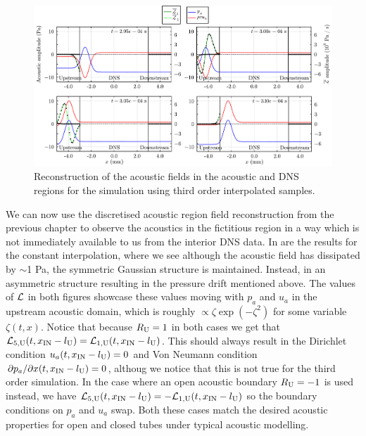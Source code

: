 \begin{figure}[t]
\centering
\includegraphics[scale=0.35]{assets/graphs/ac_frames.pdf}
\caption{Reconstruction of the acoustic fields in the acoustic and DNS regions for the simulation using third order interpolated samples.}
\label{fig:ac-reconstruct_order3}
\end{figure}

We can now use the discretised acoustic region field reconstruction from the previous chapter to observe the acoustics in the fictitious region in a way which is not immediately available to us from the interior DNS data. In  are the results for the constant interpolation, where we see although the acoustic field has dissipated by $\sim$1 Pa, the symmetric Gaussian structure is maintained. Instead, in  an asymmetric structure resulting in the pressure drift mentioned above. The values of $\cl{L}$ in both figures showcase these values moving with $p_a$ and $u_a$ in the upstream acoustic domain, which is roughly $\propto ζ \exp(-ζ^2)$ for some variable $ζ(t, x)$. Notice that because $R_{\rm{U}} = 1$ in both cases we get that $\cl{L}_{5, \rm{U}}(t, x_{\rm{IN}} - l_{\rm{U}}) = \cl{L}_{1, \rm{U}}(t, x_{\rm{IN}} - l_{\rm{U}})$. This should always result in the Dirichlet condition $u_a(t, x_{\rm{IN}} - l_{\rm{U}}) = 0$ and Von Neumann condition $\partial p_a / \partial x(t, x_{\rm{IN}} - l_{\rm{U}}) = 0$, althoug we notice that this is not true for the third order simulation. In the case where an open acoustic boundary $R_{\rm{U}} = -1$ is used instead, we have $\cl{L}_{5, \rm{U}}(t, x_{\rm{IN}} - l_{\rm{U}}) = -\cl{L}_{1, \rm{U}}(t, x_{\rm{IN}} - l_{\rm{U}})$ so the boundary conditions on $p_a$ and $u_a$ swap. Both these cases match the desired acoustic properties for open and closed tubes under typical acoustic modelling.




